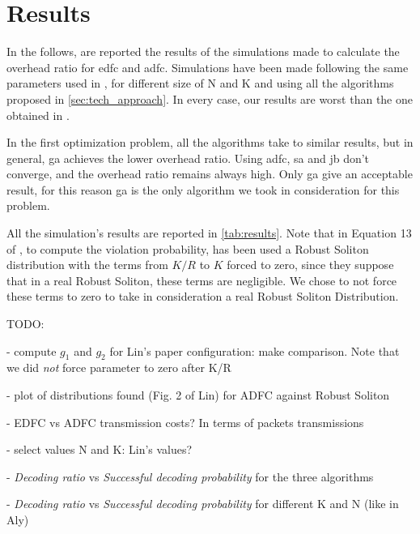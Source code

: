 \documentclass[12pt,journal,draftclsnofoot,onecolumn]{IEEEtran}
\begin{document}
\section{Results} \label{sec:results}

In the follows, are reported the results of the simulations made to calculate the overhead ratio for \gls{edfc} and \gls{adfc}.
Simulations have been made following the same parameters used in \cite{Lin2007}, for different size of N and K and using all the algorithms proposed in \autoref{sec:tech_approach}.
In every case, our results are worst than the one obtained in \cite{Lin2007}.

In the first optimization problem, all the algorithms take to similar results, but in general, \gls{ga} achieves the lower overhead ratio.
Using \gls{adfc}, \gls{sa} and \gls{jb} don't converge, and the overhead ratio remains always high. Only \gls{ga} give an acceptable result, for this reason \gls{ga} is the only algorithm we took in consideration for this problem.

All the simulation's results are reported in \autoref{tab:results}.
Note that in Equation 13 of \cite{Lin2007}, to compute the violation probability, has been used a Robust Soliton distribution with the terms from $K/R$ to $K$ forced to zero, since they suppose that in a real Robust Soliton, these terms are negligible. We chose to not force these terms to zero to take in consideration a real Robust Soliton Distribution.

TODO:

- compute $g_1$ and $g_2$ for Lin's paper configuration: make comparison. Note that we did \emph{not} force parameter to zero after K/R

- plot of distributions found (Fig. 2 of Lin) for ADFC against Robust Soliton

- EDFC vs ADFC transmission costs? In terms of packets transmissions

- select values N and K: Lin's values?

- \emph{Decoding ratio} vs \emph{Successful decoding probability} for the three algorithms

- \emph{Decoding ratio} vs \emph{Successful decoding probability} for different K and N (like in Aly)
\end{document}
